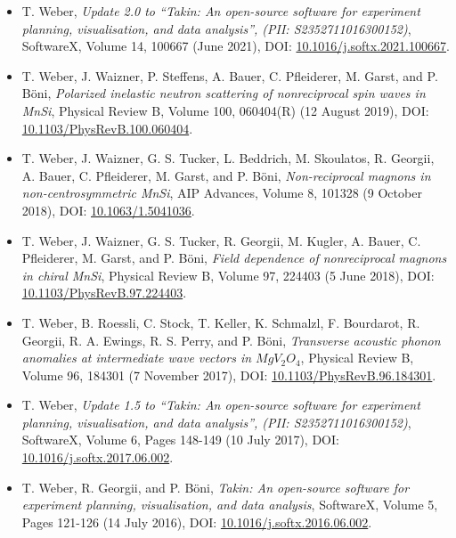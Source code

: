 \begin{itemize}
	\item T. Weber, \textit{Update 2.0 to ``Takin: An open-source software for experiment planning, visualisation, and data analysis'', (PII: S2352711016300152)},
	SoftwareX, Volume 14, 100667 (June 2021),
	DOI: \href{https://doi.org/10.1016/j.softx.2021.100667}{10.1016/j.softx.2021.100667}.

	\item T. Weber, J. Waizner, P. Steffens, A. Bauer, C. Pfleiderer, M. Garst, and P. B\"oni, 
	\textit{Polarized inelastic neutron scattering of nonreciprocal spin waves in MnSi},
	Physical Review B, Volume 100, 060404(R) (12 August 2019),
	DOI: \href{https://doi.org/10.1103/PhysRevB.100.060404}{10.1103/PhysRevB.100.060404}.

	\item  T. Weber, J. Waizner, G. S. Tucker, L. Beddrich, M. Skoulatos, R. Georgii, A. Bauer, C. Pfleiderer, M. Garst, and P. B\"oni, 
	\textit{Non-reciprocal magnons in non-centrosymmetric MnSi},
	AIP Advances, Volume 8, 101328 (9 October 2018),
	DOI: \href{https://doi.org/10.1063/1.5041036}{10.1063/1.5041036}.

	\item T. Weber, J. Waizner, G. S. Tucker, R. Georgii, M. Kugler, A. Bauer, C. Pfleiderer, M. Garst, and P. B\"oni, 
	\textit{Field dependence of nonreciprocal magnons in chiral MnSi},
	Physical Review B, Volume 97, 224403 (5 June 2018),
	DOI: \href{https://doi.org/10.1103/PhysRevB.97.224403}{10.1103/PhysRevB.97.224403}.

	\item T. Weber, B. Roessli, C. Stock, T. Keller, K. Schmalzl, F. Bourdarot, R. Georgii, R. A. Ewings, R. S. Perry, and P. B\"oni, 
	\textit{Transverse acoustic phonon anomalies at intermediate wave vectors in $MgV_2O_4$},
	Physical Review B, Volume 96, 184301 (7 November 2017),
	DOI: \href{https://doi.org/10.1103/PhysRevB.96.184301}{10.1103/PhysRevB.96.184301}.
	
	\item T. Weber, \textit{Update 1.5 to ``Takin: An open-source software for experiment planning, visualisation, and data analysis'', (PII: S2352711016300152)},
	SoftwareX, Volume 6, Pages 148-149 (10 July 2017),
	DOI: \href{https://doi.org/10.1016/j.softx.2017.06.002}{10.1016/j.softx.2017.06.002}.

	\item T. Weber, R. Georgii, and P. B\"oni,
	\textit{Takin: An open-source software for experiment planning, visualisation, and data analysis},
	SoftwareX, Volume 5, Pages 121-126 (14 July 2016),
	DOI: \href{https://doi.org/10.1016/j.softx.2016.06.002}{10.1016/j.softx.2016.06.002}.


\end{itemize}
